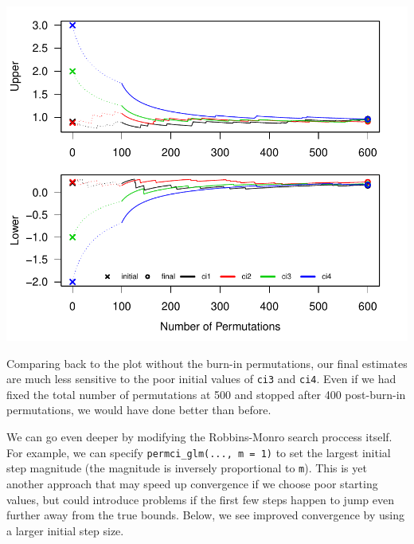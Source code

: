 \documentclass[12pt]{article}\usepackage[]{graphicx}\usepackage[]{color}
\makeatletter
\def\maxwidth{ %
  \ifdim\Gin@nat@width>\linewidth
    \linewidth
  \else
    \Gin@nat@width
  \fi
}
\newenvironment{knitrout}{}{} %
\makeatother
\begin{document}
\begin{knitrout}
\color{fgcolor}

{\centering \includegraphics[width=\maxwidth]{figure/ci_plots2-1} 

}



\end{knitrout}
Comparing back to the plot without the burn-in permutations, our final estimates are much less sensitive to the poor initial values of \texttt{ci3} and \texttt{ci4}. Even if we had fixed the total number of permutations at 500 and stopped after 400 post-burn-in permutations, we would have done better than before.

We can go even deeper by modifying the Robbins-Monro search proccess itself. For example, we can specify \texttt{permci\_glm(..., m = 1)} to set the largest initial step magnitude (the magnitude is inversely proportional to \texttt{m}). This is yet another approach that may speed up convergence if we choose poor starting values, but could introduce problems if the first few steps happen to jump even further away from the true bounds. Below, we see improved convergence by using a larger initial step size.
\end{document}
